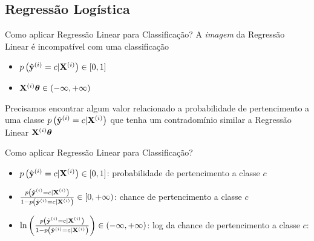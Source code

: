 \documentclass[aspectratio=169,xcolor=dvipsnames]{beamer}
\begin{document}
\subsection{Regressão Logística}
\begin{frame}{Como aplicar Regressão Linear para Classificação?}
A \textit{imagem} da Regressão Linear é incompatível com uma classificação
\begin{itemize}
    \item $p\left(\hat{\mathbf{y}}^{(i)}=c|\mathbf{X}^{(i)}\right)\in[0,1]$
    \item $\mathbf{X}^{(i)}\bm{\theta}\in(-\infty,+\infty)$
\end{itemize}

Precisamos encontrar algum valor relacionado a probabilidade de pertencimento a uma classe $p\left(\hat{\mathbf{y}}^{(i)}=c|\mathbf{X}^{(i)}\right)$ que tenha um contradomínio similar a Regressão Linear $\mathbf{X}^{(i)}\bm{\theta}$
    
\end{frame}

\begin{frame}{Como aplicar Regressão Linear para Classificação?}

\begin{itemize}
    \item<1-> $p\left(\hat{\mathbf{y}}^{(i)}=c|\mathbf{X}^{(i)}\right)\in[0,1]$: probabilidade de pertencimento a classe $c$ 
    \item<2-> $\frac{p\left(\hat{\mathbf{y}}^{(i)}=c|\mathbf{X}^{(i)}\right)}{1-p\left(\hat{\mathbf{y}}^{(i)}=c|\mathbf{X}^{(i)}\right)}\in[0,+\infty)$: chance de pertencimento a classe $c$
    \item<3-> $\ln{\left(\frac{p\left(\hat{\mathbf{y}}^{(i)}=c|\mathbf{X}^{(i)}\right)}{1-p\left(\hat{\mathbf{y}}^{(i)}=c|\mathbf{X}^{(i)}\right)}\right)}\in(-\infty,+\infty)$: log da chance de pertencimento a classe $c$: 
\end{itemize}

\end{frame}
\end{document}
